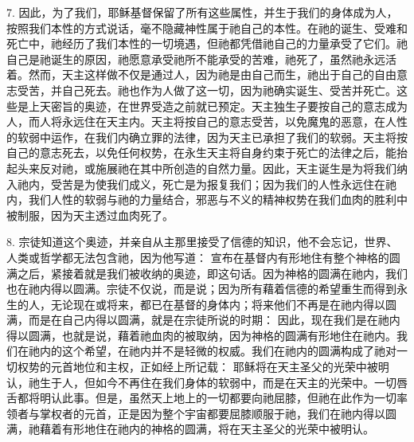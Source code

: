 7. 因此，为了我们，耶稣基督保留了所有这些属性，并生于我们的身体成为人，按照我们本性的方式说话，毫不隐藏神性属于祂自己的本性。在祂的诞生、受难和死亡中，祂经历了我们本性的一切境遇，但祂都凭借祂自己的力量承受了它们。祂自己是祂诞生的原因，祂愿意承受祂所不能承受的苦难，祂死了，虽然祂永远活着。然而，天主这样做不仅是通过人，因为祂是由自己而生，祂出于自己的自由意志受苦，并自己死去。祂也作为人做了这一切，因为祂确实诞生、受苦并死亡。这些是上天密旨的奥迹，在世界受造之前就已预定。天主独生子要按自己的意志成为人，而人将永远住在天主内。天主将按自己的意志受苦，以免魔鬼的恶意，在人性的软弱中运作，在我们内确立罪的法律，因为天主已承担了我们的软弱。天主将按自己的意志死去，以免任何权势，在永生天主将自身约束于死亡的法律之后，能抬起头来反对祂，或施展祂在其中所创造的自然力量。因此，天主诞生是为将我们纳入祂内，受苦是为使我们成义，死亡是为报复我们；因为我们的人性永远住在祂内，我们人性的软弱与祂的力量结合，邪恶与不义的精神权势在我们血肉的胜利中被制服，因为天主透过血肉死了。\par

8. 宗徒知道这个奥迹，并亲自从主那里接受了信德的知识，他不会忘记，世界、人类或哲学都无法包含祂，因为他写道： 宣布在基督内有形地住有整个神格的圆满之后，紧接着就是我们被收纳的奥迹，即这句话。因为神格的圆满在祂内，我们也在祂内得以圆满。宗徒不仅说，而是说；因为所有藉着信德的希望重生而得到永生的人，无论现在或将来，都已在基督的身体内；将来他们不再是在祂内得以圆满，而是在自己内得以圆满，就是在宗徒所说的时期： 因此，现在我们是在祂内得以圆满，也就是说，藉着祂血肉的被取纳，因为神格的圆满有形地住在祂内。我们在祂内的这个希望，在祂内并不是轻微的权威。我们在祂内的圆满构成了祂对一切权势的元首地位和主权，正如经上所记载： 耶稣将在天主圣父的光荣中被明认，祂生于人，但如今不再住在我们身体的软弱中，而是在天主的光荣中。一切唇舌都将明认此事。但是，虽然天上地上的一切都要向祂屈膝，但祂在此作为一切率领者与掌权者的元首，正是因为整个宇宙都要屈膝顺服于祂，我们在祂内得以圆满，祂藉着有形地住在祂内的神格的圆满，将在天主圣父的光荣中被明认。\par

